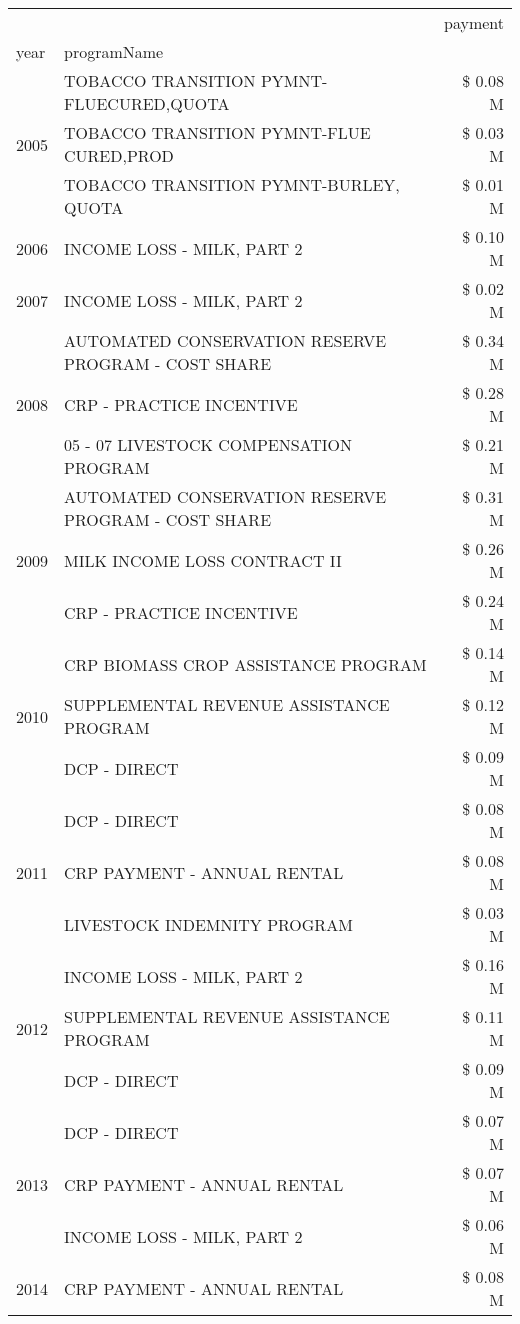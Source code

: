 \begin{tabular}{llr}
\toprule
 &  & payment \\
year & programName &  \\
\midrule
\multirow[t]{3}{*}{2005} & TOBACCO TRANSITION PYMNT-FLUECURED,QUOTA & \$ 0.08 M \\
 & TOBACCO TRANSITION PYMNT-FLUE CURED,PROD & \$ 0.03 M \\
 & TOBACCO TRANSITION PYMNT-BURLEY, QUOTA & \$ 0.01 M \\
\cline{1-3}
2006 & INCOME LOSS - MILK, PART 2 & \$ 0.10 M \\
\cline{1-3}
2007 & INCOME LOSS - MILK, PART 2 & \$ 0.02 M \\
\cline{1-3}
\multirow[t]{3}{*}{2008} & AUTOMATED CONSERVATION RESERVE PROGRAM - COST SHARE & \$ 0.34 M \\
 & CRP - PRACTICE INCENTIVE & \$ 0.28 M \\
 & 05 - 07 LIVESTOCK COMPENSATION PROGRAM & \$ 0.21 M \\
\cline{1-3}
\multirow[t]{3}{*}{2009} & AUTOMATED CONSERVATION RESERVE PROGRAM - COST SHARE & \$ 0.31 M \\
 & MILK INCOME LOSS CONTRACT II & \$ 0.26 M \\
 & CRP - PRACTICE INCENTIVE & \$ 0.24 M \\
\cline{1-3}
\multirow[t]{3}{*}{2010} & CRP BIOMASS CROP ASSISTANCE PROGRAM & \$ 0.14 M \\
 & SUPPLEMENTAL REVENUE ASSISTANCE PROGRAM & \$ 0.12 M \\
 & DCP - DIRECT & \$ 0.09 M \\
\cline{1-3}
\multirow[t]{3}{*}{2011} & DCP - DIRECT & \$ 0.08 M \\
 & CRP PAYMENT - ANNUAL RENTAL & \$ 0.08 M \\
 & LIVESTOCK INDEMNITY PROGRAM & \$ 0.03 M \\
\cline{1-3}
\multirow[t]{3}{*}{2012} & INCOME LOSS - MILK, PART 2 & \$ 0.16 M \\
 & SUPPLEMENTAL REVENUE ASSISTANCE PROGRAM & \$ 0.11 M \\
 & DCP - DIRECT & \$ 0.09 M \\
\cline{1-3}
\multirow[t]{3}{*}{2013} & DCP - DIRECT & \$ 0.07 M \\
 & CRP PAYMENT - ANNUAL RENTAL & \$ 0.07 M \\
 & INCOME LOSS - MILK, PART 2 & \$ 0.06 M \\
\cline{1-3}
\multirow[t]{3}{*}{2014} & CRP PAYMENT - ANNUAL RENTAL & \$ 0.08 M \\

\end{tabular}
